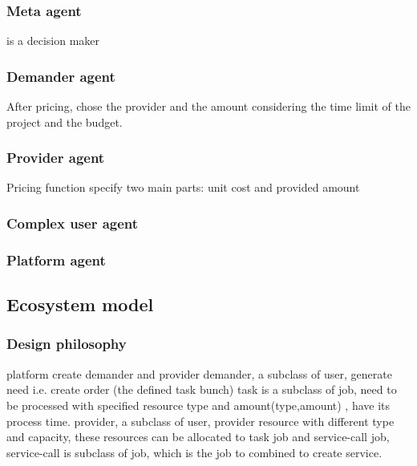 \subsubsection{Meta agent} %
\label{ssub:meta_agent}
is a decision maker

\subsubsection{Demander agent} %
\label{ssub:demander_agent}
After pricing, chose the provider and the amount considering the time limit of the project and the budget.

\subsubsection{Provider agent} %
\label{ssub:provider_agent}
Pricing function specify two main parts:
unit cost and
provided amount

\subsubsection{Complex user agent} %
\label{ssub:complex_user_agent}


\subsubsection{Platform agent} %
\label{ssub:platform_agent}



\subsection{Ecosystem model} %
\label{sub:ecosystem model}


\subsubsection{Design philosophy} %
\label{ssub:design_philosophy}
platform create demander and provider
demander, a subclass of user, generate need i.e. create order (the defined task bunch)
    task is a subclass of job, need to be processed with specified resource type and amount(type,amount) , have its process time.
provider, a subclass of user, provider resource with different type and capacity, these resources can be allocated to task job and service-call job, service-call is subclass of job, which is the job to combined to create service.

